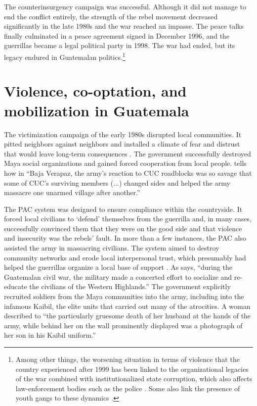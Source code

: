 \documentclass[12pt, notitlepage]{article}
\begin{document}
The counterinsurgency campaign was successful.
Although it did not manage to end the conflict entirely, the strength of the rebel movement decreased significantly in the late 1980s and the war reached an impasse.
The peace talks finally culminated in a peace agreement signed in December 1996, and the guerrillas became a legal political party in 1998.
The war had ended, but its legacy endured in Guatemalan politics.\footnote{Among other things, the worsening situation in terms of violence that the country experienced after 1999 has been linked to the organizational legacies of the war combined with institutionalized state corruption, which also affects law-enforcement bodies such as the police \citep{Peacock:2003tt, Beltran:2016td, Booth:2010wd}. Some also link the presence of youth gangs to these dynamics \citep{Levenson:2013tm}.}

\section*{Violence, co-optation, and mobilization in Guatemala}

The victimization campaign of the early 1980s disrupted local communities. It pitted neighbors against neighbors and installed a climate of fear and distrust that would leave long-term consequences \citep{Burrell:2013aa}.
The government successfully destroyed Maya social organizations and gained forced cooperation from local people.
\citet[101]{Stoll:1999aa} tells how in ``Baja Verapaz, the army's reaction to CUC roadblocks was so savage that some of CUC's surviving members (...) changed sides and helped the army massacre one unarmed village after another.''

The PAC system was designed to ensure compliance within the countryside.
It forced local civilians to `defend' themselves from the guerrilla and, in many cases, successfully convinced them that they were on the good side and that violence and insecurity was the rebels' fault.
In more than a few instances, the PAC also assisted the army in massacring civilians.
The system aimed to destroy community networks and erode local interpersonal trust, which presumably had helped the guerrillas organize a local base of support \citep{SaenzdeTejada:2004aa}.
As \citet[641]{Bateson:2017aa} says, ``during the Guatemalan civil war, the military made a concerted effort to socialize and re-educate the civilians of the Western Highlands.''
The government explicitly recruited soldiers from the Maya communities into the army, including into the infamous Kaibil, the elite units that carried out many of the atrocities.
A woman described to \citet[112]{Green:1995aa} ``the particularly gruesome death of her husband at the hands of the army, while behind her on the wall prominently displayed was a photograph of her son in his Kaibil uniform.''
\end{document}
